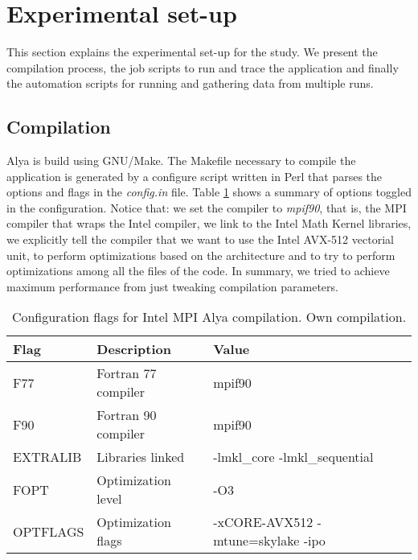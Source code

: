 \section{Experimental set-up}

This section explains the experimental set-up for the study. We present the compilation process, the job scripts to run and trace the application and finally the automation scripts for running and gathering data from multiple runs. 

\subsection{Compilation}

Alya is build using GNU/Make\cite{gnumake}. The Makefile necessary to compile the application is generated by a configure script written in Perl that parses the options and flags in the \textit{config.in} file. Table \ref{flagsintel} shows a summary of options toggled in the configuration. Notice that: we set the compiler to \textit{mpif90}, that is, the MPI compiler that wraps the Intel compiler,  we link to the Intel Math Kernel libraries\cite{intelmkl}, we explicitly tell the compiler that we want to use the Intel AVX-512 vectorial unit, to perform optimizations based on the architecture and to try to perform optimizations among all the files of the code.  In summary, we tried to achieve maximum performance from just tweaking compilation parameters.

\begin{table}[htbp]
\centering
\begin{tabular}{l|l|l} 
\toprule
\textbf{Flag}     & \textbf{Description}         & \textbf{Value}                                                                       \\ 
\hline
F77      & Fortran 77 compiler & mpif90                                                                      \\ 
\hline
F90      & Fortran 90 compiler & mpif90                                                                      \\ 
\hline
EXTRALIB & Libraries linked    & -lmkl\_core -lmkl\_sequential                                               \\ 
\hline 
FOPT     & Optimization level  & -O3                                                                         \\ 
\hline
OPTFLAGS & Optimization flags  & -xCORE-AVX512 -mtune=skylake -ipo                                           \\
\bottomrule
\end{tabular}
\caption[Configuration flags for Intel MPI Alya compilation.]{Configuration flags for Intel MPI Alya compilation. Own compilation.}
\label{flagsintel}
\end{table}

